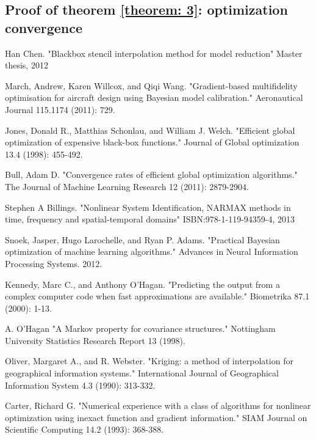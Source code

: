 \documentclass[a4paper,onecolumn]{article}
\theoremstyle{remark}
\begin{document}
\begin{appendices}
    \section{Proof of theorem \ref{theorem: 3}: optimization convergence}
\end{appendices}

\begin{thebibliography}{9}
Han Chen.
"Blackbox stencil interpolation method for model reduction"
Master thesis, 2012
 

March, Andrew, Karen Willcox, and Qiqi Wang. 
"Gradient-based multifidelity optimisation for aircraft design using Bayesian model calibration." 
Aeronautical Journal 115.1174 (2011): 729.

Jones, Donald R., Matthias Schonlau, and William J. Welch. 
"Efficient global optimization of expensive black-box functions." 
Journal of Global optimization 13.4 (1998): 455-492.

Bull, Adam D. 
"Convergence rates of efficient global optimization algorithms." 
The Journal of Machine Learning Research 12 (2011): 2879-2904.

Stephen A Billings.
"Nonlinear System Identification, NARMAX methods in time, frequency and spatial-temporal domains"
ISBN:978-1-119-94359-4, 2013

Snoek, Jasper, Hugo Larochelle, and Ryan P. Adams. 
"Practical Bayesian optimization of machine learning algorithms." 
Advances in Neural Information Processing Systems. 2012.

Kennedy, Marc C., and Anthony O'Hagan. 
"Predicting the output from a complex computer code when fast approximations are available." 
Biometrika 87.1 (2000): 1-13.

A. O'Hagan 
"A Markov property for covariance structures." 
Nottingham University Statistics Research Report 13 (1998).

Oliver, Margaret A., and R. Webster. 
"Kriging: a method of interpolation for geographical information systems." 
International Journal of Geographical Information System 4.3 (1990): 313-332.

Carter, Richard G. 
"Numerical experience with a class of algorithms for nonlinear optimization using inexact function and gradient information." 
SIAM Journal on Scientific Computing 14.2 (1993): 368-388.


\end{thebibliography}
\end{document}
